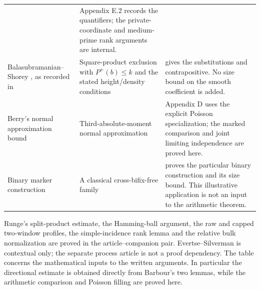 \begin{tabularx}{\textwidth}{@{}L{.225\textwidth}L{.315\textwidth}>{\raggedright\arraybackslash}X@{}}
& Appendix E.2 records the quantifiers; the private-coordinate and medium-prime rank arguments are internal.\\
Balasubramanian--Shorey \cite{BalasubramanianShorey1993}, as recorded in \cite[pp.~55--56]{Shorey1994BakerApplications}
& Square-product exclusion with $P^+(b)\le k$ and the stated height/density conditions
&  gives the substitutions and contrapositive. No size bound on the smooth coefficient is added.\\
Berry's normal approximation bound \cite{Berry1941}
& Third-absolute-moment normal approximation
& Appendix D uses the explicit Poisson specialization; the marked comparison and joint limiting independence are proved here.\\
Binary marker construction \cite{CheeKiahPurkayasthaWang2013}
& A classical cross-bifix-free family
&  proves the particular binary construction and its size bound. This illustrative application is not an input to the arithmetic theorem.\\
\bottomrule
\end{tabularx}
\endgroup

\medskip
Runge's split-product estimate, the Hamming-ball argument, the raw and
capped two-window profiles, the simple-incidence rank lemma and the
relative bulk normalization are proved in the article--companion pair.
Evertse--Silverman is contextual only; the separate process article is
not a proof dependency. The table concerns the mathematical inputs to the
written arguments. In particular the directional estimate is obtained
directly from Barbour's two lemmas, while the arithmetic comparison and
Poisson filling are proved here.
